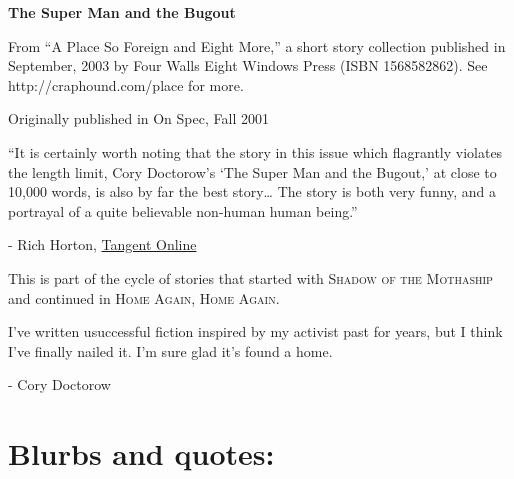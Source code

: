 

\newenvironment{authorof}{\begin{flushright}\sffamily}{\end{flushright}}


\begin{center}
\textbf{\huge\textsf{
The Super Man and the Bugout
}}
\end{center}


\noindent

From ``A Place So Foreign and Eight More,'' a short story
collection published in September, 2003 by Four Walls Eight Windows
Press (ISBN 1568582862). See http://craphound.com/place for more.

Originally published in On Spec, Fall 2001

``It is certainly worth noting that the story in this issue which flagrantly 
violates the length limit, Cory Doctorow's `The Super Man and the Bugout,' at 
close to 10,000 words, is also by far the best story\ldots{} The story is both 
very funny, and a portrayal of a quite believable non-human human being.''

\begin{authorof}
- Rich Horton,
  \href{http://www.tangentonline.com/reviews/magazine.php3?review=153}
  {Tangent Online}
\end{authorof}

\medskip

This is part of the cycle of stories that started with
\textsc{Shadow of the Mothaship}
and continued in
\textsc{Home Again, Home Again.}

I've written usuccessful fiction inspired by my activist past for
years, but I think I've finally nailed it. I'm sure glad it's found a home.
\begin{authorof}
- Cory Doctorow
\end{authorof}

\section{Blurbs and quotes:}

